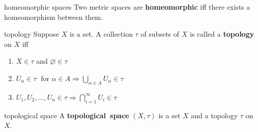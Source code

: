 \documentclass[avery5371,grid]{flashcards}
\begin{document}
\begin{flashcard}[Definition]{homeomorphic spaces}
Two metric spaces are \mbox{\textbf{homeomorphic}} iff there exists a
homeomorphism between them.
\end{flashcard}

\begin{flashcard}[Definition]{topology}
Suppose $X$ is a set.  A collection $\tau$ of subsets of $X$ is called
a \mbox{\textbf{topology}} on $X$ iff
\begin{enumerate}
 \item $X \in \tau$ and $\varnothing \in \tau$
 \item $U_{\alpha} \in \tau \;
 \mbox{ for } \alpha \in A \Rightarrow
 \displaystyle \bigcup_{\alpha \in A} U_{\alpha} \in \tau$
 \item $U_1, U_2, \ldots , U_n \in \tau \Rightarrow
 \displaystyle \bigcap_{i=1}^{\infty} U_i \in \tau$
\end{enumerate}
\end{flashcard}

\begin{flashcard}[Definition]{topological space}
A \mbox{\textbf{topological space}} $(X,\tau)$ is a set $X$ and a 
topology $\tau$ on $X$.
\end{flashcard}
\end{document}

